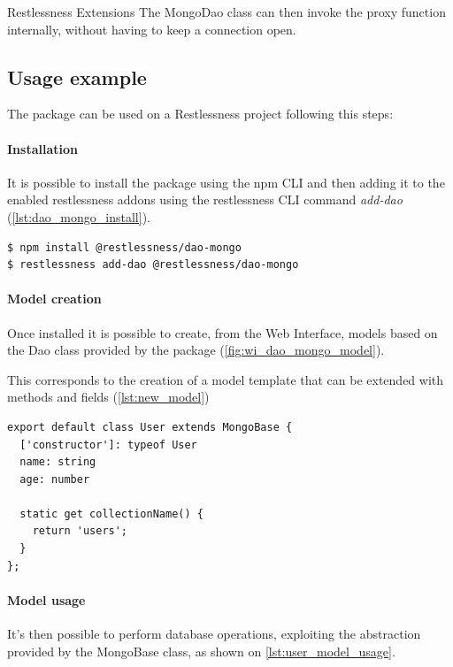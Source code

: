 \begin{chapter}{Restlessness Extensions}
    The MongoDao class can then invoke the proxy function internally, without having
    to keep a connection open.

    \subsection{Usage example}
    The package can be used on a Restlessness project following this steps:

    \paragraph{Installation}
    It is possible to install the package using the npm CLI and then adding it to
    the enabled restlessness addons using the restlessness CLI command \textit{add-dao}
    (\ref{lst:dao_mongo_install}).

    \bigskip
    \begin{lstlisting}[caption=dao-mongo installation, label={lst:dao_mongo_install}]
$ npm install @restlessness/dao-mongo
$ restlessness add-dao @restlessness/dao-mongo
    \end{lstlisting}

    \paragraph{Model creation}
    Once installed it is possible to create, from the Web Interface, models based on
    the Dao class provided by the package (\ref{fig:wi_dao_mongo_model}).

    This corresponds to the creation of a model template that can be extended with
    methods and fields (\ref{lst:new_model})

    \bigskip
    \begin{lstlisting}[caption=A new model based on the dao-mongo package, label={lst:new_model}]
export default class User extends MongoBase {
  ['constructor']: typeof User
  name: string
  age: number

  static get collectionName() {
    return 'users';
  }
};
    \end{lstlisting}

    \paragraph{Model usage}
    It's then possible to perform database operations, exploiting the abstraction
    provided by the MongoBase class, as shown on \ref{lst:user_model_usage}.


\end{chapter}
